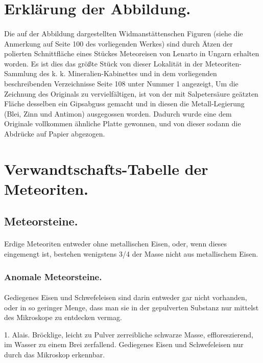 \documentclass[a4paper, 11pt, oneside, polutonikogreek, german]{article}
\begin{document}
\section{Erklärung der Abbildung.}
\paragraph{}
Die auf der Abbildung dargestellten Widmanstättenschen Figuren (siehe die Anmerkung auf Seite 100 des vorliegenden Werkes) sind durch Ätzen der polierten Schnittfläche eines Stückes Meteoreisen von Lenarto in Ungarn erhalten worden. Es ist dies das größte Stück von dieser Lokalität in der Meteoriten-Sammlung des k. k. Mineralien-Kabinettes und in dem vorliegenden beschreibenden Verzeichnisse Seite 108 unter Nummer 1 angezeigt, Um die Zeichnung des Originals zu vervielfältigen, ist von der mit Salpetersäure geätzten Fläche desselben ein Gipsabguss gemacht und in diesen die Metall-Legierung (Blei, Zinn und Antimon) ausgegossen worden. Dadurch wurde eine dem Originale vollkommen ähnliche Platte gewonnen, und von dieser sodann die Abdrücke auf Papier abgezogen.
\clearpage
\section{Verwandtschafts-Tabelle der Meteoriten.}
\subsection{Meteorsteine.}
\paragraph{}
Erdige Meteoriten entweder ohne metallischen Eisen, oder, wenn dieses eingemengt ist, bestehen wenigstens 3/4 der Masse nicht aus metallischem Eisen.
\subsubsection{Anomale Meteorsteine.}
\paragraph{}
Gediegenes Eisen und Schwefeleisen sind darin entweder gar nicht vorhanden, oder in so geringer Menge, dass man sie in der gepulverten Substanz nur mittelst des Mikroskope zu entdecken vermag.

1. Alais. Bröcklige, leicht zu Pulver zerreibliche schwarze Masse, effloreszierend, im Wasser zu einem Brei zerfallend. Gediegenes Eisen und Schwefeleisen nur durch das Mikroskop erkennbar.
\end{document}
